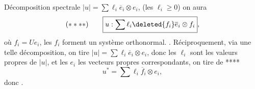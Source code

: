 Décomposition spectrale  $|u|=\sum\ell_i\overline e_i\otimes e_i$, (les $\ell_i\geq0$)
on aura
\[
(****)\qquad\boxed{u:\sum\ell_i\deleted{f_i}\overline e_i\otimes f_i},
\]
où $f_i=Ue_i$, les $f_i$ forment un système orthonormal. 
.
Réciproquement, via une telle décomposition, on tire $|u|=\sum\ell_i\overline e_i\otimes e_i$, donc les $\ell_i$ sont les valeurs propres de $|u|$, et les $e_i$ les vecteurs propres correspondants, on tire de ****
\[
u^*=\sum\ell_i\overline f_i\otimes e_i,
\]
donc . 
